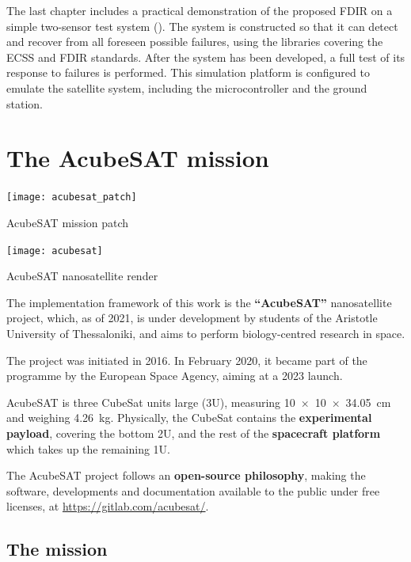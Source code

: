 \documentclass[a4paper,nobib]{tufte-book}
\begin{document}
The last chapter includes a practical demonstration of the proposed \acs{FDIR} on a simple two-sensor test system (). The system is constructed so that it can detect and recover from all foreseen possible failures, using the libraries covering the \acs{ECSS} and \acs{FDIR} standards. After the system has been developed, a full test of its response to failures is performed. This simulation platform is configured to emulate the satellite system, including the microcontroller and the ground station.

\chapter{The AcubeSAT mission}
\label{cap:acubesat}

\begin{marginfigure}
    \texttt{[image: acubesat\_patch]}
    \caption{AcubeSAT mission patch}
\end{marginfigure}

\begin{marginfigure}
    \centering
    \texttt{[image: acubesat]}
    \caption{AcubeSAT nanosatellite render}
\end{marginfigure}


The implementation framework of this work is the \textbf{``AcubeSAT''} nanosatellite project, which, as of 2021, is under development by students of the Aristotle University of Thessaloniki, and aims to perform biology-centred research in space.

The project was initiated in 2016. In February 2020, it became part of the  programme by the European Space Agency, aiming at a 2023 launch.

AcubeSAT is three CubeSat units large (3U), measuring \SI[product-units = single]{10 x 10 x 34.05}{\centi\metre} and weighing \SI{4.26}{\kilo\gram}. Physically, the CubeSat contains the \textbf{experimental payload}, covering the bottom 2U, and the rest of the \textbf{spacecraft platform} which takes up the remaining 1U.

The AcubeSAT project follows an \textbf{open-source philosophy}, making the software, developments and documentation available to the public under free licenses, at \url{https://gitlab.com/acubesat/}.

\section{The mission}
\end{document}
